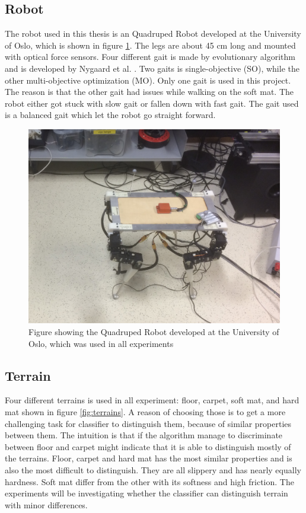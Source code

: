 \documentclass[USenglish]{ifimaster}  %
\begin{document}
\subsection{Robot}
The robot used in this thesis is an Quadruped Robot developed at the University of Oslo, which is shown in figure \ref{fig:robot}. The legs are about 45 cm long and mounted with optical force sensors. Four different gait is made by evolutionary algorithm and is developed by Nygaard et al. \cite{7850167}. Two gaits is single-objective (SO), while the other multi-objective optimization (MO). Only one gait is used in this project. The reason is that the other gait had issues while walking on the soft mat. The robot either got stuck with slow gait or fallen down with fast gait. The gait used is a balanced gait which let the robot go straight forward. 
	
	
\begin{figure}[h]
	\centering
		\includegraphics[width=\textwidth,height=\textheight,keepaspectratio]{Figures/Robot3}
		\caption{Figure showing the Quadruped Robot developed at the University of Oslo, which was used in all experiments}
		\label{fig:robot}
	\end{figure}
	\FloatBarrier
	
\subsection{Terrain} \label{seq:terrain}
Four different terrains is used in all experiment: floor, carpet, soft mat, and hard mat shown in figure \ref{fig:terrains}. A reason of choosing those is to get a more challenging task for classifier to distinguish them, because of similar properties between them. The intuition is that if the algorithm manage to discriminate between floor and carpet might indicate that it is able to distinguish mostly of the terrains. Floor, carpet and hard mat  has the most similar properties and is also the most difficult to distinguish. They are all slippery and has nearly equally hardness. Soft mat differ from the other with its softness and high friction. The experiments will be investigating whether the classifier can distinguish terrain with minor differences.
	
\end{document}
